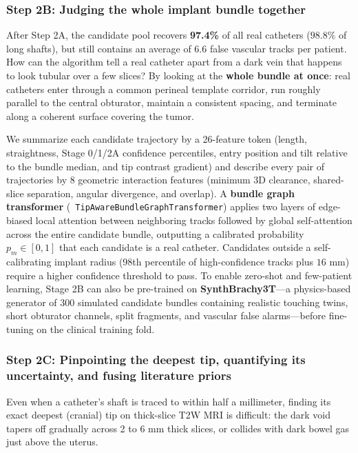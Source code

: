 \documentclass[
  11pt,
]{article}
\let\nforigtexttt\texttt
\renewcommand{\texttt}[1]{\nforigtexttt{\XeTeXinterchartokenstate=1 #1}}
\begin{document}
\subsubsection{Step 2B: Judging the whole implant bundle
together}\label{step-2b-judging-the-whole-implant-bundle-together}

After Step 2A, the candidate pool recovers \textbf{97.4\%} of all real
catheters (\(98.8\%\) of long shafts), but still contains an average of
6.6 false vascular tracks per patient. How can the algorithm tell a real
catheter apart from a dark vein that happens to look tubular over a few
slices? By looking at the \textbf{whole bundle at once}: real catheters
enter through a common perineal template corridor, run roughly parallel
to the central obturator, maintain a consistent spacing, and terminate
along a coherent surface covering the tumor.

We summarize each candidate trajectory by a 26-feature token (length,
straightness, Stage 0/1/2A confidence percentiles, entry position and
tilt relative to the bundle median, and tip contrast gradient) and
describe every pair of trajectories by 8 geometric interaction features
(minimum 3D clearance, shared-slice separation, angular divergence, and
overlap). A \textbf{bundle graph transformer}
(\texttt{TipAwareBundleGraphTransformer}) applies two layers of
edge-biased local attention between neighboring tracks followed by
global self-attention across the entire candidate bundle, outputting a
calibrated probability \(p_m \in [0, 1]\) that each candidate is a real
catheter. Candidates outside a self-calibrating implant radius (98th
percentile of high-confidence tracks plus \(16\text{ mm}\)) require a
higher confidence threshold to pass. To enable zero-shot and few-patient
learning, Stage 2B can also be pre-trained on \textbf{SynthBrachy3T}---a
physics-based generator of 300 simulated candidate bundles containing
realistic touching twins, short obturator channels, split fragments, and
vascular false alarms---before fine-tuning on the clinical training
fold.

\subsubsection{Step 2C: Pinpointing the deepest tip, quantifying its
uncertainty, and fusing literature
priors}\label{step-2c-pinpointing-the-deepest-tip-quantifying-its-uncertainty-and-fusing-literature-priors}

Even when a catheter's shaft is traced to within half a millimeter,
finding its exact deepest (cranial) tip on thick-slice T2W MRI is
difficult: the dark void tapers off gradually across 2 to 6 mm thick
slices, or collides with dark bowel gas just above the uterus.
\end{document}
